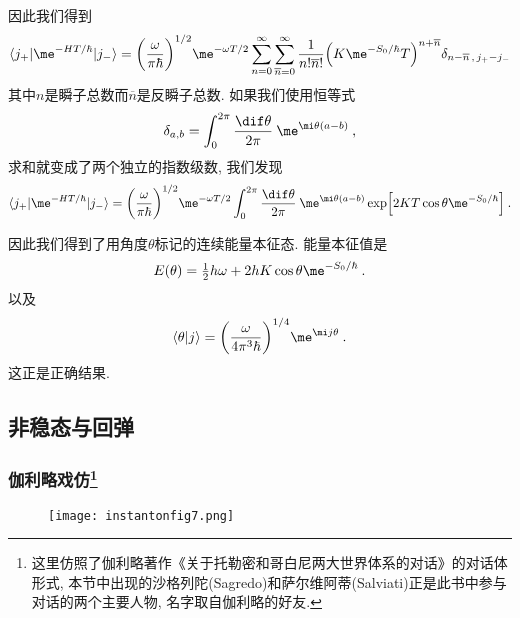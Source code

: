 因此我们得到
\begin{equation}
    \langle j_{+} \vert \me^{-HT/\hbar} \vert j_{-} \rangle = \biggl( \frac{\omega}{\pi\hbar}\biggr)^{1/2} \me^{-\omega T/2}
    \sum_{n=0}^{\infty}\sum_{\overline{n}=0}^{\infty} \frac{1}{n!\overline{n}!} \Bigl( K\me^{-S_{0}/\hbar}T\Bigr)^{n+\overline{n}}
    \delta_{n-\overline{n}\,,\,j_{+}-j_{-}} \label{instanton2.42}
\end{equation}
其中$n$是瞬子总数而$\overline{n}$是反瞬子总数. 如果我们使用恒等式
\begin{equation}
    \delta_{a,b}= \int_{0}^{2\pi} \frac{\dif \theta}{2\pi} \:\me^{\mi\theta(a-b)} \:, \label{instanton2.43}
\end{equation}
求和就变成了两个独立的指数级数, 我们发现
\begin{equation}
    \langle j_{+} \vert \me^{-HT/\hbar} \vert j_{-} \rangle = \biggl( \frac{\omega}{\pi\hbar}\biggr)^{1/2} \me^{-\omega T/2}
    \int_{0}^{2\pi}  \frac{\dif \theta}{2\pi} \:\me^{\mi\theta(a-b)}\exp\Bigl[2KT\cos\theta \me^{-S_{0}/\hbar}\Bigr] \:. \label{instanton2.44}
\end{equation}

因此我们得到了用角度$\theta$标记的连续能量本征态. 能量本征值是
\begin{equation}
    E(\theta) = \tfrac{1}{2}h\omega +2 hK \cos\theta \me^{-S_{0}/\hbar} \:. \label{instanton2.45}
\end{equation}
以及
\begin{equation}
    \langle \theta \vert j\rangle =\biggl( \frac{\omega}{4\pi^{3}\hbar}\biggr)^{1/4}  \me^{\mi j\theta} \:. \label{instanton2.46}
\end{equation}
这正是正确结果.

\subsection{非稳态与回弹}

\subsubsection*{伽利略戏仿\footnote{这里仿照了伽利略著作《关于托勒密和哥白尼两大世界体系的对话》的对话体形式, 本节中出现的沙格列陀(Sagredo)和萨尔维阿蒂(Salviati)正是此书中参与对话的两个主要人物, 名字取自伽利略的好友.}} 

\begin{figure}[h]
    \centering
    \texttt{[image: instantonfig7.png]}
    \caption{ \label{instantonfig7}}
  \end{figure}

